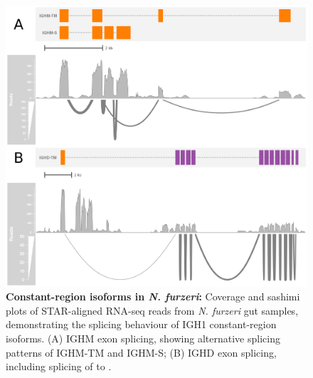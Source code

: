 	\begin{figure}
	\centering
			    \begin{subfigure}{0em}
        \label{fig:nfu-locus-sashimi-a}
    \end{subfigure}
    \begin{subfigure}{0em}
        \label{fig:nfu-locus-sashimi-b}
    \end{subfigure}
	\includegraphics[width=\textwidth]{_Figures/png/nfu-locus-sashimi}
	\caption[Constant-region isoforms in \textit{N. furzeri}]{\textbf{Constant-region isoforms in \textit{N. furzeri}:} Coverage and sashimi plots of STAR-aligned RNA-seq reads from \textit{N. furzeri} gut samples, demonstrating the splicing behaviour of IGH1 constant-region isoforms. (A) IGHM exon splicing, showing alternative splicing patterns of IGHM-TM and IGHM-S; (B) IGHD exon splicing, including splicing of  to .}
	\label{fig:nfu-locus-sashimi}
	\end{figure}
	
